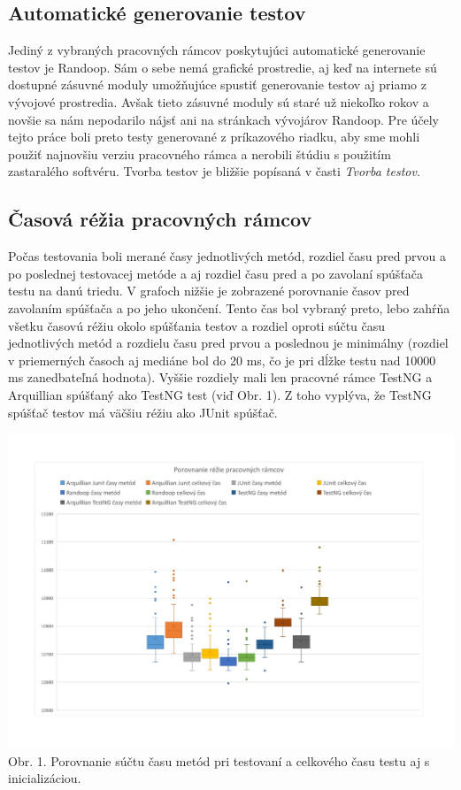 \documentclass[11pt,twoside,slovak,a4paper]{article}
\begin{document}
	\subsection{Automatické generovanie testov}
	Jediný z vybraných pracovných rámcov poskytujúci automatické generovanie testov je Randoop. Sám o sebe nemá grafické prostredie, aj keď na internete sú dostupné zásuvné moduly umožňujúce spustiť generovanie testov aj priamo z vývojové prostredia. Avšak tieto zásuvné moduly sú staré už niekoľko rokov a novšie sa nám nepodarilo nájsť ani na stránkach vývojárov Randoop. Pre účely tejto práce boli preto testy generované z príkazového riadku, aby sme mohli použiť najnovšiu verziu pracovného rámca a nerobili štúdiu s použitím zastaralého softvéru. Tvorba testov je bližšie popísaná v časti \textit{Tvorba testov}.	
	
	\subsection{Časová réžia pracovných rámcov}
	Počas testovania boli merané časy jednotlivých metód, rozdiel času pred prvou a po poslednej testovacej metóde a aj rozdiel času pred a po zavolaní spúšťača testu na danú triedu. V grafoch nižšie je zobrazené porovnanie časov pred zavolaním spúšťača a po jeho ukončení. Tento čas bol vybraný preto, lebo zahŕňa všetku časovú réžiu okolo spúšťania testov a rozdiel oproti súčtu času jednotlivých metód a rozdielu času pred prvou a poslednou je minimálny (rozdiel v priemerných časoch aj mediáne bol do 20 ms, čo je pri dĺžke testu nad 10000 ms zanedbateľná hodnota). Vyššie rozdiely mali len pracovné rámce TestNG a Arquillian spúšťaný ako TestNG test (viď Obr. 1). Z toho vyplýva, že TestNG spúšťač testov má väčšiu réžiu ako JUnit spúšťač.
	
	\begin{center}
		\includegraphics[width = 400pt]{graf_rezia}
		\newline
		\tiny Obr. 1. Porovnanie súčtu času metód pri testovaní a celkového času testu aj s inicializáciou.
	\end{center}
	
\end{document}
